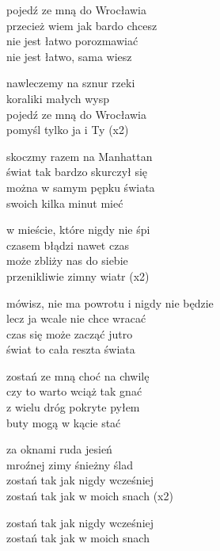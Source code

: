 \begin{text}
    pojedź ze mną do Wrocławia\\
    przecież wiem jak bardo chcesz\\
    nie jest łatwo porozmawiać\\
    nie jest łatwo, sama wiesz

    \vin nawleczemy na sznur rzeki\\
    \vin koraliki małych wysp\\
    \vin pojedź ze mną do Wrocławia\\
    \vin pomyśl tylko ja i Ty (x2)

    skoczmy razem na Manhattan\\
    świat tak bardzo skurczył się\\
    można w samym pępku świata\\
    swoich kilka minut mieć

    \vin w mieście, które nigdy nie śpi\\
    \vin czasem błądzi nawet czas\\
    \vin może zbliży nas do siebie\\
    \vin przenikliwie zimny wiatr (x2)

    mówisz, nie ma powrotu i nigdy nie będzie\\
    lecz ja wcale nie chce wracać\\
    czas się może zacząć jutro\\
    świat to cała reszta świata

    zostań ze mną choć na chwilę\\
    czy to warto wciąż tak gnać\\
    z wielu dróg pokryte pyłem\\
    buty mogą w kącie stać

    \vin za oknami ruda jesień\\
    \vin mroźnej zimy śnieżny ślad\\
    \vin zostań tak jak nigdy wcześniej\\
    \vin zostań tak jak w moich snach (x2)

    zostań tak jak nigdy wcześniej\\
    zostań tak jak w moich snach
\end{text}
\begin{chord}

\end{chord}